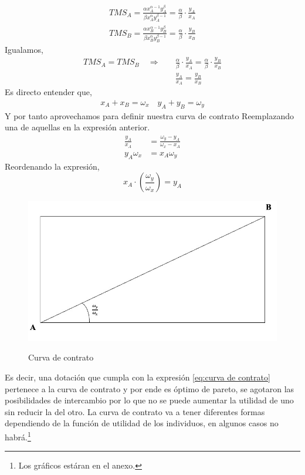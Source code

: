 \begin{align*}
    TMS_A  = \frac{\alpha x_A^{\alpha -1} y_A^{\beta}}{\beta x_A^\alpha y_A^{\beta -1} } = \frac{\alpha}{\beta} \cdot \frac{y_A}{x_A} \\
    TMS_B= \frac{\alpha x_B^{\alpha -1} y_B^{\beta}}{\beta x_B^\alpha y_B^{\beta -1} } = \frac{\alpha}{\beta} \cdot \frac{y_B}{x_B} 
\end{align*}
Igualamos,
\begin{align*}
    TMS_A = TMS_B \quad \Longrightarrow \quad& \frac{\alpha}{\beta} \cdot \frac{y_A}{x_A} = \frac{\alpha}{\beta} \cdot \frac{y_B}{x_B} \\
   &  \frac{y_A}{x_A} = \frac{y_B}{x_B}
\end{align*}
Es directo entender que,
\begin{align*}
    x_A + x_B = \omega_x \quad 
    y_A + y_B = \omega_y
\end{align*}
Y por tanto aprovechamos para definir nuestra curva de contrato Reemplazando una de aquellas en la expresión anterior.
\begin{align*}
    \frac{y_A}{x_A} &= \frac{\omega_y - y_A}{\omega_x - x_A} \\
    y_A\omega_x &= x_A\omega_y
\end{align*}
Reordenando la expresión,
\begin{equation}
    x_A \cdot \left( \frac{\omega_y}{ \omega_x} \right) = y_A \label{eq:curva de contrato}
\end{equation}
\begin{figure}[h]
    \centering
    \caption{Curva de contrato}
    \includegraphics[width=\textwidth]{Figuras/EG Curva de contrato.jpeg}
    \label{fig:diapositiva3}
\end{figure}
Es decir, una dotación que cumpla con la expresión \ref{eq:curva de contrato} pertenece a la curva de contrato y por ende es óptimo de pareto, se agotaron las posibilidades de intercambio por lo que no se puede aumentar la utilidad de uno sin reducir la del otro. La curva de contrato va a tener diferentes formas dependiendo de la función de utilidad de los individuos, en algunos casos no habrá.\footnote{Los gráficos estáran en el anexo.} 

